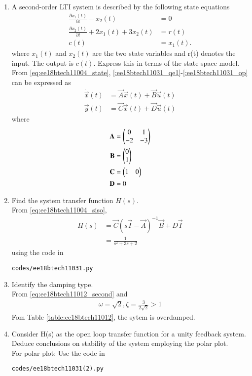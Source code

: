 \begin{enumerate}[label=\thesubsection.\arabic*.,ref=\thesubsection.\theenumi]

\item A second-order LTI system is described by the following state equations
\begin{align}
\label{:ee18btech11031_qe1}
\frac{\partial x_1(t)}{\partial t} - x_2(t) &= 0
\\
\label{:ee18btech11031_qe2}
\frac{\partial x_2(t)}{\partial t} + 2x_1(t) + 3x_2(t) &= r(t)
\\
c(t) &= x_1(t).
\label{:ee18btech11031_op}
\end{align}
%
where $x_1(t)$ and $x_2(t)$ are the two state variables and r(t) denotes the input. The output is $c(t)$.  Express this in terms of the state space model.
%
\\
\solution From \eqref{eq:ee18btech11004_state}, \eqref{:ee18btech11031_qe1}-\eqref{:ee18btech11031_op} can be expressed as
%
\begin{align}
\dot{\vec{x}}(t)&=\vec{A}\vec{x}(t)+\vec{B}\vec{u}(t) \\
 \vec{y}(t)&=\vec{C}\vec{x}(t)+\vec{D} \vec{u}(t)
\end{align}
%
where
\begin{align}
    \mathbf{A} &= \begin{pmatrix}0&1\\-2&-3\end{pmatrix}
\\
    \mathbf{B} &= \begin{pmatrix}0\\1\end{pmatrix}
\\
    \mathbf{C} &= \begin{pmatrix}1&0\end{pmatrix}
\\
    \mathbf{D} &= 0
\end{align}

\item Find the system transfer function $H(s)$.
%
\\
\solution From \eqref{eq:ee18btech11004_siso},
%
\begin{align}
H(s) &=  \vec{C}{(s\vec{I}-\vec{A})^{-1}}\vec{B}+D\vec{I}
\\
&  = \frac{1}{s^{2}+3s+2}
\label{eq:ee18btech11031_H}
\end{align}
%
using the code in 
\begin{lstlisting}
codes/ee18btech11031.py
\end{lstlisting}
%
\item Identify the damping type.
\\
\solution From \eqref{eq:ee18btech11012_second} and \label{eq:ee18btech11031_H}
%
\begin{align}
\omega = \sqrt{2}, \zeta = \frac{3}{2\sqrt{2}} > 1
\end{align}
Fom Table \ref{table:ee18btech11012}, the sytem is overdamped.
%
\item Consider H(s) as the open loop transfer function for a unity feedback system. Deduce conclusions on stability of the system employing the polar plot.
\\
\solution For polar plot: Use the code in 
\begin{lstlisting}
codes/ee18btech11031(2).py
\end{lstlisting}


\end{enumerate}
